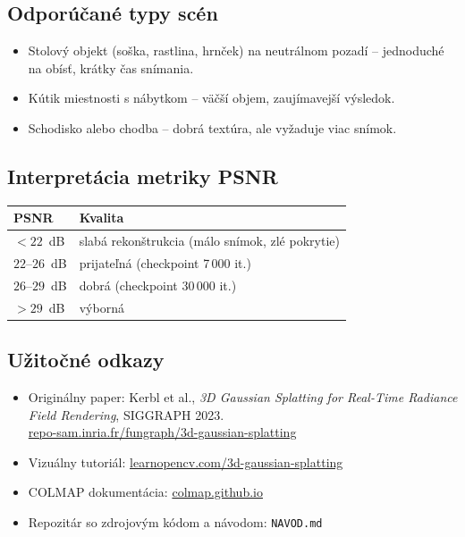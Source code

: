 \documentclass{article}
\begin{document}
\subsection*{Odporúčané typy scén}

\begin{itemize}
    \item Stolový objekt (soška, rastlina, hrnček) na neutrálnom pozadí –
          jednoduché na obísť, krátky čas snímania.
    \item Kútik miestnosti s nábytkom – väčší objem, zaujímavejší výsledok.
    \item Schodisko alebo chodba – dobrá textúra, ale vyžaduje viac snímok.
\end{itemize}

\subsection*{Interpretácia metriky PSNR}

\begin{center}
\begin{tabular}{ll}
\toprule
PSNR & Kvalita \\
\midrule
$< 22$~dB & slabá rekonštrukcia (málo snímok, zlé pokrytie) \\
$22$–$26$~dB & prijateľná (checkpoint 7\,000 it.) \\
$26$–$29$~dB & dobrá (checkpoint 30\,000 it.) \\
$> 29$~dB & výborná \\
\bottomrule
\end{tabular}
\end{center}

\subsection*{Užitočné odkazy}

\begin{itemize}
    \item Originálny paper: Kerbl et al., \textit{3D Gaussian Splatting for
          Real-Time Radiance Field Rendering}, SIGGRAPH 2023.\\
          \href{https://repo-sam.inria.fr/fungraph/3d-gaussian-splatting/}{repo-sam.inria.fr/fungraph/3d-gaussian-splatting}
    \item Vizuálny tutoriál:
          \href{https://learnopencv.com/3d-gaussian-splatting/}{learnopencv.com/3d-gaussian-splatting}
    \item COLMAP dokumentácia:
          \href{https://colmap.github.io/}{colmap.github.io}
    \item Repozitár so zdrojovým kódom a návodom: \texttt{NAVOD.md}
\end{itemize}
\end{document}
